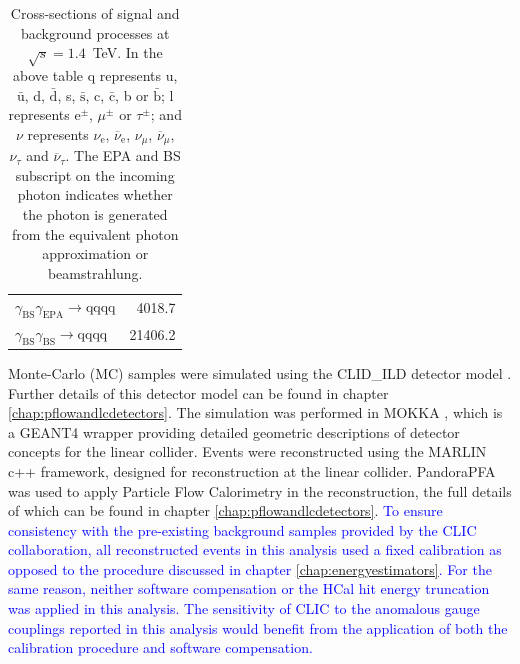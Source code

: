 \begin{table}[h!]
\begin{tabular}{ l r }
$\gamma_{\text{BS}}\gamma_{\text{EPA}} \rightarrow \text{qqqq}$ & 4018.7\\
$\gamma_{\text{BS}}\gamma_{\text{BS}} \rightarrow \text{qqqq}$ & 21406.2\\
\hline
\end{tabular}
\caption[Cross-sections of signal and background processes at $\sqrt{s}=1.4$~TeV]{Cross-sections of signal and background processes at $\sqrt{s}=1.4$~TeV.  In the above table q represents u, $\bar{\text{u}}$, d, $\bar{\text{d}}$, s, $\bar{\text{s}}$, c, $\bar{\text{c}}$, b or $\bar{\text{b}}$;  l represents $\text{e}^{\pm}$, $\mu^{\pm}$ or $\tau^{\pm}$; and $\nu$ represents $\nu_{\text{e}}$, $\overline{\nu}_{\text{e}}$, $\nu_{\mu}$, $\overline{\nu}_{\mu}$, $\nu_{\tau}$ and $\overline{\nu}_{\tau}$.  The EPA and BS subscript on the incoming photon indicates whether the photon is generated from the equivalent photon approximation or beamstrahlung.}
\label{table:crosssection1400GeV}
\end{table}

Monte-Carlo (MC) samples were simulated using the CLID\_ILD detector model \cite{arXiv:1006.3396}.  Further details of this detector model can be found in chapter \ref{chap:pflowandlcdetectors}.  The simulation was performed in MOKKA \cite{MoradeFreitas:2002kj}, which is a GEANT4 \cite{Agostinelli:2002hh} wrapper providing detailed geometric descriptions of detector concepts for the linear collider.  Events were reconstructed using the MARLIN \cite{Gaede:2006pj} c++ framework, designed for reconstruction at the linear collider.  PandoraPFA \cite{arXiv:0907.3577, arXiv:1209.4039} was used to apply Particle Flow Calorimetry in the reconstruction, the full details of which can be found in chapter \ref{chap:pflowandlcdetectors}.  \textcolor{blue}{To ensure consistency with the pre-existing background samples provided by the CLIC collaboration, all reconstructed events in this analysis used a fixed calibration as opposed to the procedure discussed in chapter \ref{chap:energyestimators}.  For the same reason, neither software compensation or the HCal hit energy truncation was applied in this analysis.  The sensitivity of CLIC to the anomalous gauge couplings reported in this analysis would benefit from the application of both the calibration procedure and software compensation.}

